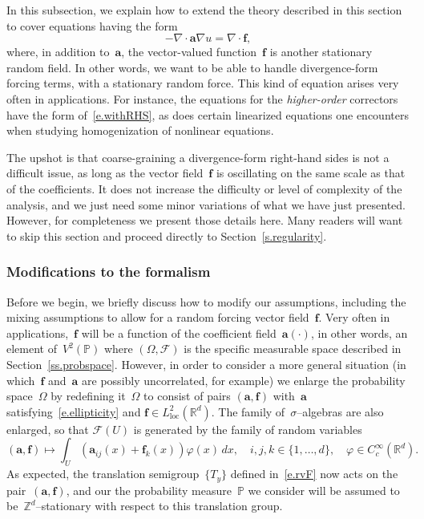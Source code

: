 \documentclass[11pt]{article} %
\numberwithin{equation}{section}
\theoremstyle{definition}
\newcommand*{\Zd}{\ensuremath{\mathbb{Z}^d}}
\newcommand*{\Rd}{\ensuremath{\mathbb{R}^d}}
\newcommand{\f}{\mathbf{f}}
\renewcommand{\a}{\mathbf{a}}
\newcommand{\F}{\mathcal{F}}
\renewcommand{\P}{\mathbb{P}}
\begin{document}
In this subsection, we explain how to extend the theory described in this section to cover equations having the form 
\begin{equation}
\label{e.withRHS}
-\nabla \cdot \a \nabla u = \nabla\cdot \f,
\end{equation}
where, in addition to~$\a$, the vector-valued function~$\f$ is another stationary random field. 
In other words, we want to be able to handle divergence-form forcing terms, with a stationary random force. 
This kind of equation arises very often in applications. For instance, the equations for the \emph{higher-order} correctors have the form of~\eqref{e.withRHS}, as does certain linearized equations one encounters when studying homogenization of nonlinear equations. 

\smallskip

The upshot is that coarse-graining a divergence-form right-hand sides is not a difficult issue, as long as the vector field~$\f$ is oscillating on the same scale as that of the coefficients. It does not increase the difficulty or level of complexity of the analysis, and we just need some minor variations of what we have just presented. However, for completeness we present those details here. Many readers will want to skip this section and proceed directly to Section~\ref{s.regularity}.

\subsubsection{Modifications to the formalism}
\label{sss.formalisms.for.RHS}

Before we begin, we briefly discuss how to modify our assumptions, including the mixing assumptions to allow for a random forcing vector field~$\f$. Very often in applications,~$\f$ will be a function of the coefficient field~$\a(\cdot)$, in other words, an element of~$V^2(\P)$ where $(\Omega,\F)$ is the specific measurable space described in Section~\ref{ss.probspace}. 
However, in order to consider a more general situation (in which~$\f$ and~$\a$ are possibly uncorrelated, for example) we enlarge the probability space~$\Omega$ by redefining it~$\Omega$ to consist of pairs $(\a,\f)$ with~$\a$ satisfying~\eqref{e.ellipticity} and $\f\in L^2_{\mathrm{loc}}(\Rd)$. The family of~$\sigma$--algebras are also enlarged, so that $\F(U)$ is generated by the family of random variables 
\begin{equation*} \label{}
(\a,\f) \mapsto \int_U ( \a_{ij} (x) + \f_k(x))  \varphi(x)\,dx, 
\quad 
i,j,k \in\{1,\ldots,d\}, 
\quad 
\varphi\in C^\infty_c(\Rd). 
\end{equation*}
As expected, the translation semigroup~$\{ T_y \}$ defined in~\eqref{e.rvF} now acts on the pair~$(\a,\f)$, and our the probability measure~$\P$ we consider will be assumed to be~$\Zd$--stationary with respect to this translation group. 
\end{document}
